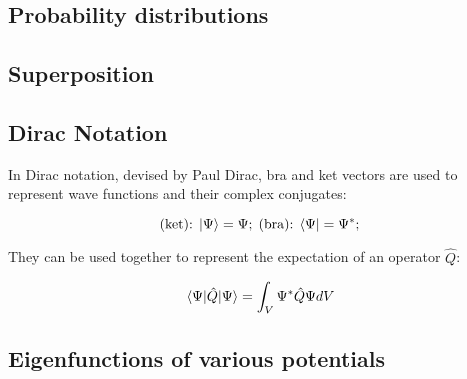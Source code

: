 \subsection{Probability distributions}
\subsection{Superposition}
\subsection{Dirac Notation}

In Dirac notation, devised by Paul Dirac, bra and ket vectors are used to represent wave functions and their complex conjugates:

\[ \text{(ket):\;} \ket{\Psi} = \Psi; \; \text{(bra):\;} \bra{\Psi} = \Psi^*; \]

They can be used together to represent the expectation of an operator $\hat{Q}$:

\[ \expval{\hat{Q}}{\Psi} = \int_{V} \Psi^*\hat{Q}\Psi dV \]
\subsection{Eigenfunctions of various potentials}
